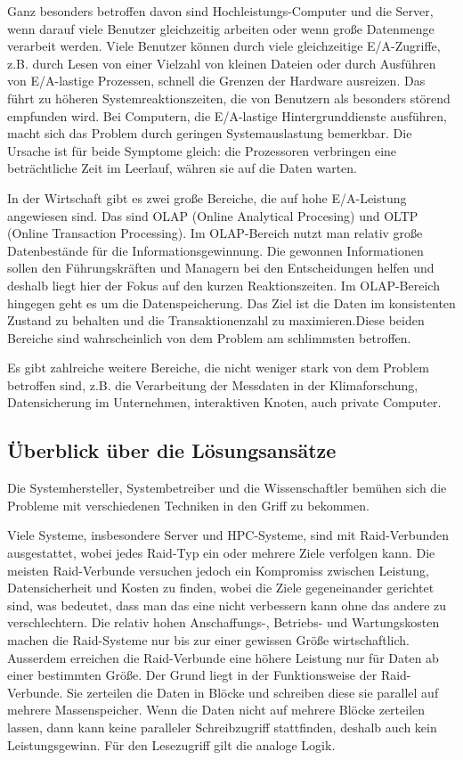 Ganz besonders betroffen davon sind Hochleistungs-Computer und die Server, wenn darauf viele Benutzer gleichzeitig arbeiten oder wenn große Datenmenge verarbeit werden. Viele Benutzer können durch viele gleichzeitige E/A-Zugriffe, z.B. durch Lesen von einer Vielzahl von kleinen Dateien oder durch Ausführen von E/A-lastige Prozessen, schnell die Grenzen der Hardware ausreizen. Das führt zu höheren Systemreaktionszeiten, die von Benutzern als besonders störend empfunden wird. Bei Computern, die E/A-lastige Hintergrunddienste ausführen, macht sich das Problem durch geringen Systemauslastung bemerkbar. Die Ursache ist für beide Symptome gleich: die Prozessoren verbringen eine beträchtliche Zeit im Leerlauf, währen sie auf die Daten warten. 

In der Wirtschaft gibt es zwei große Bereiche, die auf hohe E/A-Leistung angewiesen sind. Das sind OLAP (Online Analytical Procesing) und OLTP (Online Transaction Processing). Im OLAP-Bereich nutzt man relativ große Datenbestände für die Informationsgewinnung. Die gewonnen Informationen sollen den Führungskräften und Managern bei den Entscheidungen helfen und deshalb liegt hier der Fokus auf den kurzen Reaktionszeiten. Im OLAP-Bereich hingegen geht es um die Datenspeicherung. Das Ziel ist die Daten im konsistenten Zustand zu behalten und die Transaktionenzahl zu maximieren.Diese beiden Bereiche sind wahrscheinlich von dem Problem am schlimmsten betroffen.

Es gibt zahlreiche weitere Bereiche, die nicht weniger stark von dem Problem betroffen sind, z.B. die Verarbeitung der Messdaten in der Klimaforschung, Datensicherung im Unternehmen, interaktiven Knoten, auch private Computer.

\subsection{Überblick über die Lösungsansätze}
Die Systemhersteller, Systembetreiber und die Wissenschaftler bemühen sich die Probleme mit verschiedenen Techniken in den Griff zu bekommen. 

Viele Systeme, insbesondere Server und HPC-Systeme, sind mit Raid-Verbunden ausgestattet, wobei jedes Raid-Typ ein oder mehrere Ziele verfolgen kann. Die meisten Raid-Verbunde versuchen jedoch ein Kompromiss zwischen Leistung, Datensicherheit und Kosten zu finden, wobei die Ziele gegeneinander gerichtet sind, was bedeutet, dass man das eine nicht verbessern kann ohne das andere zu verschlechtern. Die relativ hohen Anschaffungs-, Betriebs- und Wartungskosten machen die Raid-Systeme nur bis zur einer gewissen Größe wirtschaftlich. Ausserdem erreichen die Raid-Verbunde eine höhere Leistung nur für Daten ab einer bestimmten Größe. Der Grund liegt in der Funktionsweise der Raid-Verbunde. Sie zerteilen die Daten in  Blöcke und schreiben diese sie parallel auf mehrere Massenspeicher. Wenn die Daten nicht auf mehrere Blöcke zerteilen lassen, dann kann keine paralleler Schreibzugriff stattfinden, deshalb auch kein Leistungsgewinn. Für den Lesezugriff gilt die analoge Logik.


